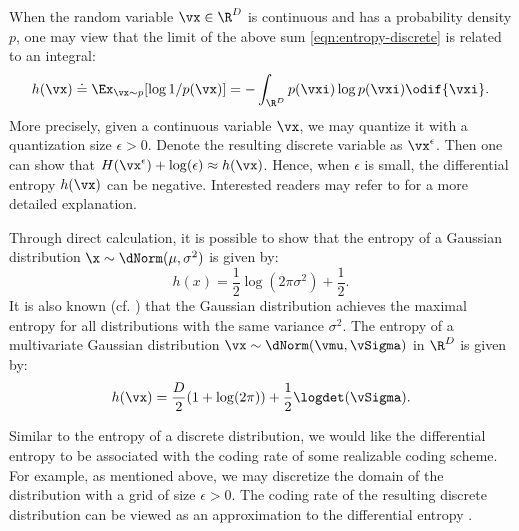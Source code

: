 \documentclass[../../book-main.tex]{subfiles}
\begin{document}
When the random variable \(\vx \in \R^{D}\) is continuous and has a probability density \(p\), one may view that the limit of the above sum \eqref{eqn:entropy-discrete} is related to an integral:
\begin{equation}
	h(\vx) \doteq \Ex_{\vx \sim p}[\log 1/p(\vx)] = - \int_{\R^{D}} p(\vxi) \log p(\vxi) \odif{\vxi}.
	\label{eqn:entropy-differential}
\end{equation}
{More precisely, given a continuous variable \(\vx\), we may quantize it with a quantization size \(\epsilon > 0\). Denote the resulting discrete variable as \(\vx^{\epsilon}\). Then one can show that \(H(\vx^{\epsilon}) + \log(\epsilon) \approx h(\vx)\). Hence, when \(\epsilon\) is small, the differential entropy \(h(\vx)\) can be negative. Interested readers may refer to \cite{Cover-Thomas} for a more detailed explanation.}

\begin{example}
	Through direct calculation, it is possible to show that the entropy of a Gaussian distribution \(\x \sim \dNorm(\mu, \sigma^2)\) is given by:
	\begin{equation}
		h(x) = \frac{1}{2}\log (2\pi \sigma^{2}) + \frac{1}{2}.
		\label{eqn:entropy-Gaussian}
	\end{equation}
	It is also known (cf. ) that the Gaussian distribution achieves the maximal entropy for all distributions with the same variance \(\sigma^{2}\). The entropy of a multivariate Gaussian distribution \(\vx \sim \dNorm(\vmu, \vSigma)\) in \(\R^{D}\) is given by:
	\begin{equation}
		h(\vx) = \frac{D}{2}(1 + \log(2\pi)) + \frac{1}{2}\logdet(\vSigma).
		\label{eqn:entropy-Gaussian-multi}
	\end{equation}
\end{example}

Similar to the entropy of a discrete distribution, we would like the differential entropy to be associated with the coding rate of some realizable coding scheme. For example, as mentioned above, we may discretize the domain of the distribution with a grid of size \(\epsilon > 0\). The coding rate of the resulting discrete distribution can be viewed as an approximation to the differential entropy \cite{Cover-Thomas}.
\end{document}
